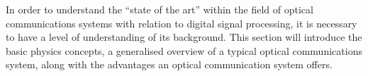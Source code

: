 In order to understand the ``state of the art'' within the field of optical
communications systems with relation to digital signal processing, it is
necessary to have a level of understanding of its background. This section will
introduce the basic physics concepts, a generalised overview of a typical
optical communications system, along with the advantages an optical
communication system offers.
